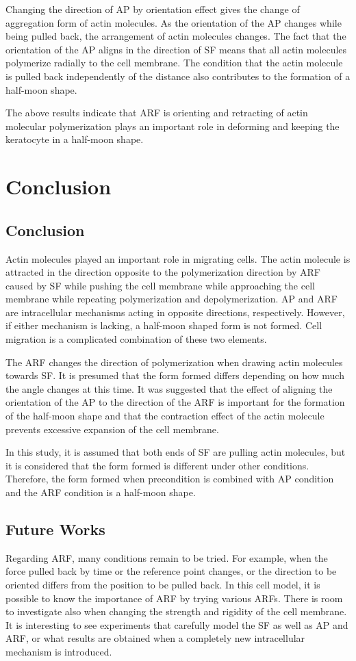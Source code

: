 \documentclass[a4paper,12pt, oneside]{book}
\begin{document}
Changing the direction of AP by orientation effect gives the change of aggregation form of actin molecules.
As the orientation of the AP changes while being pulled back, the arrangement of actin molecules changes.
The fact that the orientation of the AP aligns in the direction of SF means that all actin molecules polymerize radially to the cell membrane.
The condition that the actin molecule is pulled back independently of the distance also contributes to the formation of a half-moon shape.

The above results indicate that ARF is orienting and retracting of actin molecular polymerization plays an important role in deforming and keeping the keratocyte in a half-moon shape.




\chapter{Conclusion}
\section{Conclusion}
Actin molecules played an important role in migrating cells.
The actin molecule is attracted in the direction opposite to the polymerization direction by ARF caused by SF while pushing the cell membrane while approaching the cell membrane while repeating polymerization and depolymerization.
AP and ARF are intracellular mechanisms acting in opposite directions, respectively.
However, if either mechanism is lacking, a half-moon shaped form is not formed.
Cell migration is a complicated combination of these two elements.

The ARF changes the direction of polymerization when drawing actin molecules towards SF.
It is presumed that the form formed differs depending on how much the angle changes at this time.
It was suggested that the effect of aligning the orientation of the AP to the direction of the ARF is important for the formation of the half-moon shape and that the contraction effect of the actin molecule prevents excessive expansion of the cell membrane.

In this study, it is assumed that both ends of SF are pulling actin molecules, but it is considered that the form formed is different under other conditions.
Therefore, the form formed when precondition is combined with AP condition and the ARF condition is a half-moon shape.

\section{Future Works}
Regarding ARF, many conditions remain to be tried.
For example, when the force pulled back by time or the reference point changes, or the direction to be oriented differs from the position to be pulled back.
In this cell model, it is possible to know the importance of ARF by trying various ARFs.
There is room to investigate also when changing the strength and rigidity of the cell membrane.
It is interesting to see experiments that carefully model the SF as well as AP and ARF, or what results are obtained when a completely new intracellular mechanism is introduced.
\end{document}
